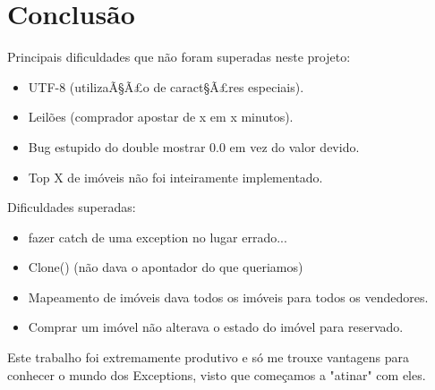 \documentclass[12pt]{article}
\begin{document}
\pagebreak

 
\section{Conclusão}

Principais dificuldades que não foram superadas neste projeto:
\begin{itemize}
\item UTF-8 (utilizaÃ§Ã£o de caract§Ã£res especiais).
\item Leilões (comprador apostar de x em x minutos).
\item Bug estupido do double mostrar 0.0 em vez do valor devido.
\item Top X de imóveis não foi inteiramente implementado.
\end{itemize}
Dificuldades superadas:
\begin{itemize}
\item fazer catch de uma exception no lugar errado...
\item Clone() (não dava o apontador do que queriamos)
\item Mapeamento de imóveis dava todos os imóveis para todos os vendedores.
\item Comprar um imóvel não alterava o estado do imóvel para reservado.
\end{itemize}

Este trabalho foi extremamente produtivo e só me trouxe vantagens para conhecer o mundo dos Exceptions, visto que começamos a "atinar" com eles.
\end{document}

